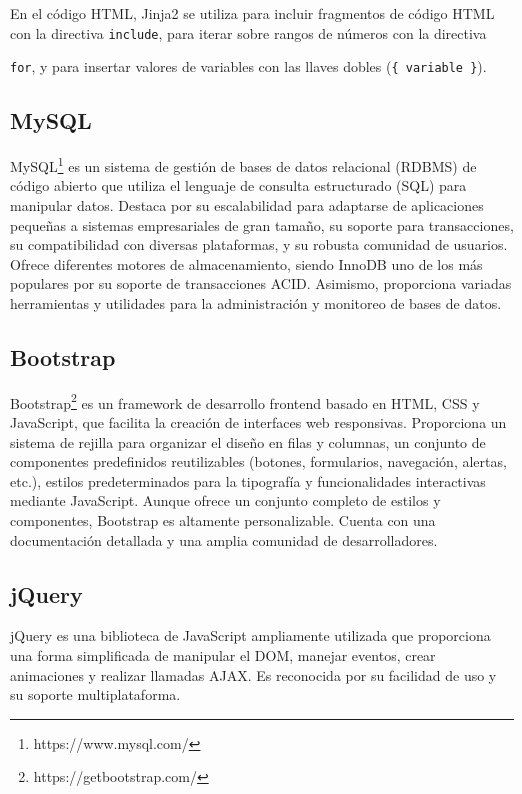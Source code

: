 \documentclass[a4paper, 12pt]{book}
\begin{document}
En el código HTML, Jinja2 se utiliza para incluir fragmentos de código HTML con la directiva \texttt{include}, para iterar sobre rangos de números con la directiva 

\texttt{for}, y para insertar valores de variables con las llaves dobles (\texttt{{\{ variable \}}}).

\subsection{MySQL}
\label{subsec:mysql} MySQL\footnote{https://www.mysql.com/} es un sistema de gestión de bases de datos relacional (RDBMS) de código abierto que utiliza el lenguaje de consulta estructurado (SQL) 
para manipular datos. Destaca por su escalabilidad para adaptarse de aplicaciones pequeñas a sistemas empresariales de gran tamaño, su soporte para transacciones, 
su compatibilidad con diversas plataformas, y su robusta comunidad de usuarios. Ofrece diferentes motores de almacenamiento, siendo InnoDB uno de los más populares 
por su soporte de transacciones ACID. Asimismo, proporciona variadas herramientas y utilidades para la administración y monitoreo de bases de datos.


\subsection{Bootstrap}
\label{subsec:bootstrap} Bootstrap\footnote{https://getbootstrap.com/} es un framework de desarrollo frontend basado en HTML, CSS y JavaScript, que facilita la creación de interfaces web responsivas. 
Proporciona un sistema de rejilla para organizar el diseño en filas y columnas, un conjunto de componentes predefinidos reutilizables (botones, formularios, navegación, 
alertas, etc.), estilos predeterminados para la tipografía y funcionalidades interactivas mediante JavaScript. Aunque ofrece un conjunto completo de estilos y 
componentes, Bootstrap es altamente personalizable. Cuenta con una documentación detallada y una amplia comunidad de desarrolladores.

\subsection{jQuery}
\label{subsec:jquery}
jQuery es una biblioteca de JavaScript ampliamente utilizada que proporciona una forma simplificada de manipular el DOM, manejar eventos, crear animaciones y realizar llamadas AJAX. Es reconocida por su facilidad de uso y su soporte multiplataforma. 
\end{document}
